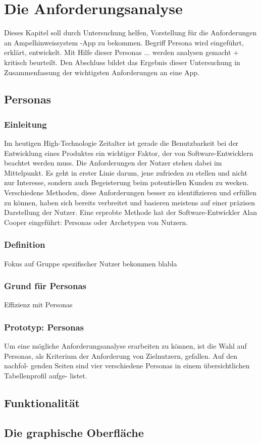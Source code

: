 \chapter{Die Anforderungsanalyse}
Dieses Kapitel soll durch Untersuchung helfen, Vorstellung für die Anforderungen an Ampelhinweissystem -App zu bekommen. Begriff Persona wird eingeführt, erklärt, entwickelt.
Mit Hilfe dieser Personas ... werden analysen gemacht + kritisch beurteilt.
Den Abschluss bildet das Ergebnis dieser Untersuchung in Zusammenfassung der wichtigsten Anforderungen an eine App.
\section{Personas}
\subsection{Einleitung}
Im heutigen High-Technologie Zeitalter ist gerade die Benutzbarkeit bei der Entwicklung eines Produktes ein wichtiger Faktor, der von Software-Entwicklern beachtet werden muss. Die Anforderungen der Nutzer stehen dabei im Mittelpunkt. Es geht in erster Linie darum, jene zufrieden zu stellen und nicht nur Interesse, sondern auch Begeisterung beim potentiellen Kunden zu wecken. Verschiedene Methoden, diese Anforderungen besser zu identifizieren und erfüllen zu können, haben sich bereits verbreitet und basieren meistens auf einer präzisen Darstellung der Nutzer. Eine erprobte Methode hat der Software-Entwickler Alan Cooper eingeführt: Personas oder Archetypen von Nutzern.
\subsection{Definition}
Fokus auf Gruppe spezifischer Nutzer bekommen blabla
\subsection{Grund für Personas}
Effizienz mit Personas
\subsection{Prototyp: Personas}
Um eine mögliche Anforderungsanalyse erarbeiten zu können, ist die
Wahl auf Personas, als Kriterium der Anforderung von Zielnutzern, gefallen. Auf den nachfol-
genden Seiten sind vier verschiedene Personas in einem übersichtlichen Tabellenprofil aufge-
listet.
\section{Funktionalität}
\section{Die graphische Oberfläche}
